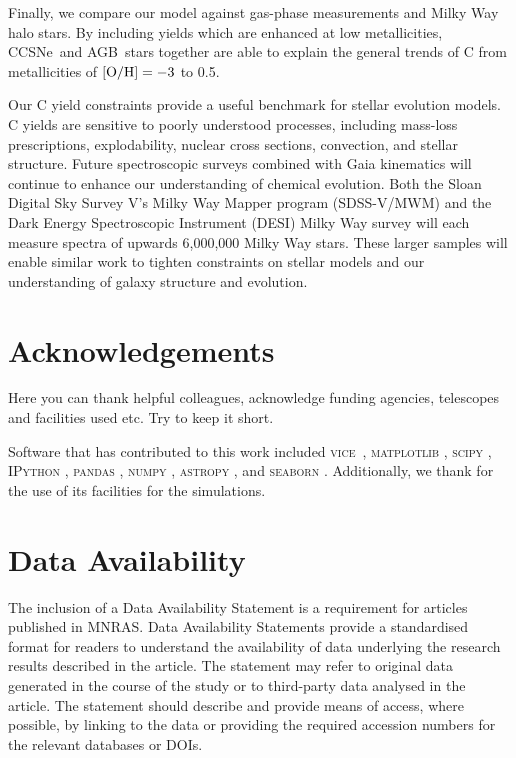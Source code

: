 \documentclass[fleqn,usenatbib]{mnras}
\newcommand{\VICE}{\textsc{vice}}
\newcommand{\agb}{AGB}
\newcommand{\cc}{CCSNe}
\begin{document}
Finally, we compare our model against gas-phase measurements and Milky Way halo stars. By including yields which are enhanced at low metallicities, \cc\ and \agb\ stars together are able to explain the general trends of C from metallicities of ${\rm [O/H]} = -3$ to 0.5. 

Our C yield constraints provide a useful benchmark for stellar evolution models. C yields are sensitive to poorly understood processes, including mass-loss prescriptions, explodability, nuclear cross sections, convection, and stellar structure. Future spectroscopic surveys combined with Gaia kinematics \citep{gaia} will continue to enhance our understanding of chemical evolution. Both the Sloan Digital Sky Survey V's Milky Way Mapper program ({\sc SDSS-V/MWM}) \citep{sdssv} and the Dark Energy Spectroscopic Instrument ({\sc DESI}) Milky Way survey \citep{desi, desi:mw} will each measure spectra of upwards 6,000,000 Milky Way stars. These larger samples will enable similar work to tighten constraints on stellar models and our understanding of galaxy structure and evolution.




\section*{Acknowledgements}

 Here you can thank helpful
colleagues, acknowledge funding agencies, telescopes and facilities used etc.
Try to keep it short.

Software that has contributed to this work included  
\VICE~\citep{JW20, james+21},
\textsc{matplotlib} \citep{matplotlib},
\textsc{scipy} \citep{scipy},
\textsc{IPython} \citep{ipy},
\textsc{pandas} \citep{pandas},
\textsc{numpy} \citep{numpy},
\textsc{astropy} \citep{astropy:2013, astropy:2018, astropy:2022},
and 
\textsc{seaborn} \citep{seaborn}
.
Additionally, we thank \citet{OhioSupercomputerCenter1987} for the use of its facilities for the simulations. 


\section*{Data Availability}

 
The inclusion of a Data Availability Statement is a requirement for articles published in MNRAS. Data Availability Statements provide a standardised format for readers to understand the availability of data underlying the research results described in the article. The statement may refer to original data generated in the course of the study or to third-party data analysed in the article. The statement should describe and provide means of access, where possible, by linking to the data or providing the required accession numbers for the relevant databases or DOIs.
\end{document}
